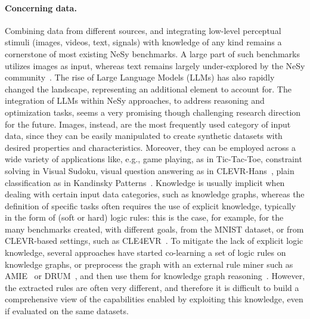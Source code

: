 \paragraph{Concerning data.}
Combining data from different sources, and integrating low-level perceptual stimuli (images, videos, text, signals) with knowledge of any kind remains a cornerstone of most existing NeSy benchmarks. A large part of such benchmarks utilizes images as input, whereas text remains largely under-explored by the NeSy community~\cite{hamilton2022neuro}. The rise of Large Language Models (LLMs) has also rapidly changed the landscape, representing an additional element to account for. The integration of LLMs within NeSy approaches, to address reasoning and optimization tasks, seems a very promising though challenging research direction for the future. Images, instead, are the most frequently used category of input data, since they can be easily manipulated to create synthetic datasets with desired properties and characteristics. Moreover, they can be employed across a wide variety of applications like, e.g., game playing, as in Tic-Tac-Toe, constraint solving in Visual Sudoku, visual question answering as in CLEVR-Hans~\cite{stammer2021right}, plain classification as in Kandinsky Patterns~\cite{muller2021kandinsky}. Knowledge is usually implicit when dealing with certain input data categories, such as knowledge graphs, whereas the definition of specific tasks often requires the use of explicit knowledge, typically in the form of (soft or hard) logic rules: this is the case, for example, for the many benchmarks created, with different goals, from the MNIST dataset, or from CLEVR-based settings, such as CLE4EVR~\cite{marconato2023neuro}. 
%
To mitigate the lack of explicit logic knowledge, several approaches have started co-learning a set of logic rules on knowledge graphs, or preprocess the graph with an external rule miner such as AMIE~\cite{galarraga2013amie} or DRUM~\cite{sadeghian2019drum}, and then use them for knowledge graph reasoning~\cite{guo2018knowledge,diligenti2023enhancing}. However, the extracted rules are often very different, and therefore it is difficult to build a comprehensive view of the capabilities enabled by exploiting this knowledge, even if evaluated on the same datasets. 

